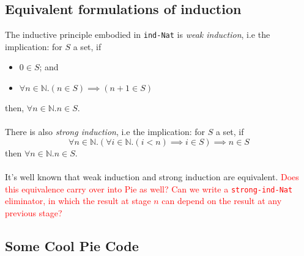 \documentclass{article}
\newcommand{\ttt}[1]{\texttt{#1}}
\newcommand{\bb}[1]{\mathbb{#1}}
\begin{document}
\subsection{Equivalent formulations of induction}
The inductive principle embodied in \ttt{ind-Nat} is \textit{weak induction}, i.e the implication: for \(S\) a set, if
\begin{itemize}
    \item \(0 \in S\); and
    \item \(\forall n \in \bb N. (n \in S) \implies (n + 1 \in S)\)
\end{itemize}
then, \(\forall n \in \bb N. n \in S\).
\\ \\
There is also \textit{strong induction}, i.e the implication: for \(S\) a set, if \[
    \forall n \in \bb N. (\forall i \in \bb N. (i < n) \implies i \in S) \implies n \in S
\]
then \(\forall n \in \bb N. n \in S\).
\\ \\
It's well known that weak induction and strong induction are equivalent. \textcolor{red}{Does this equivalence carry over into Pie as well? Can we write a \ttt{strong-ind-Nat} eliminator, in which the result at stage \(n\) can depend on the result at any previous stage?} 
\newpage
\begin{appendix}
\section{Some Cool Pie Code} \label{pie-code-appendix}
\renewcommand{\contentsname}{\normalsize Contents}
\localtableofcontents
\newpage\noindent

\end{appendix}
\end{document}
